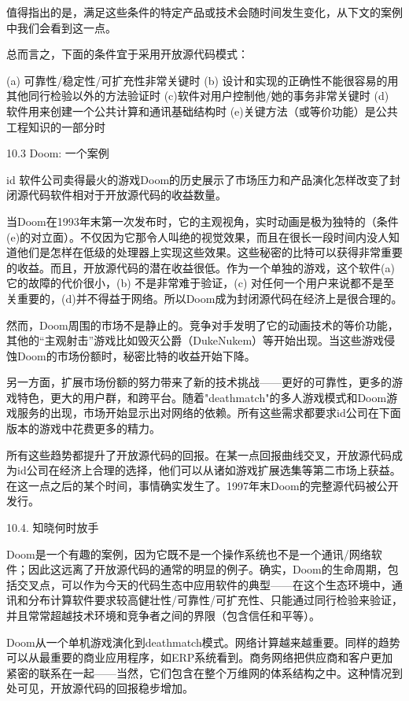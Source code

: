 \documentclass[a4paper,12pt,UTF8,twoside]{ctexbook}
\begin{document}
值得指出的是，满足这些条件的特定产品或技术会随时间发生变化，从下文的案例中我们会看到这一点。


总而言之，下面的条件宜于采用开放源代码模式：

(a) 可靠性/稳定性/可扩充性非常关键时
(b) 设计和实现的正确性不能很容易的用其他同行检验以外的方法验证时
(c)软件对用户控制他/她的事务非常关键时
(d) 软件用来创建一个公共计算和通讯基础结构时
(e)关键方法（或等价功能）是公共工程知识的一部分时


10.3 Doom: 一个案例


id 软件公司卖得最火的游戏Doom的历史展示了市场压力和产品演化怎样改变了封闭源代码软件相对于开放源代码的收益数量。


当Doom在1993年末第一次发布时，它的主观视角，实时动画是极为独特的（条件(e)的对立面）。不仅因为它那令人叫绝的视觉效果，而且在很长一段时间内没人知道他们是怎样在低级的处理器上实现这些效果。这些秘密的比特可以获得非常重要的收益。而且，开放源代码的潜在收益很低。作为一个单独的游戏，这个软件(a)它的故障的代价很小，(b) 不是非常难于验证，(c) 对任何一个用户来说都不是至关重要的，(d)并不得益于网络。所以Doom成为封闭源代码在经济上是很合理的。


然而，Doom周围的市场不是静止的。竞争对手发明了它的动画技术的等价功能，其他的“主观射击”游戏比如毁灭公爵（DukeNukem）等开始出现。当这些游戏侵蚀Doom的市场份额时，秘密比特的收益开始下降。


另一方面，扩展市场份额的努力带来了新的技术挑战——更好的可靠性，更多的游戏特色，更大的用户群，和跨平台。随着"deathmatch"的多人游戏模式和Doom游戏服务的出现，市场开始显示出对网络的依赖。所有这些需求都要求id公司在下面版本的游戏中花费更多的精力。


所有这些趋势都提升了开放源代码的回报。在某一点回报曲线交叉，开放源代码成为id公司在经济上合理的选择，他们可以从诸如游戏扩展选集等第二市场上获益。在这一点之后的某个时间，事情确实发生了。1997年末Doom的完整源代码被公开发行。


10.4. 知晓何时放手


Doom是一个有趣的案例，因为它既不是一个操作系统也不是一个通讯/网络软件；因此这远离了开放源代码的通常的明显的例子。确实，Doom的生命周期，包括交叉点，可以作为今天的代码生态中应用软件的典型——在这个生态环境中，通讯和分布计算软件要求较高健壮性/可靠性/可扩充性、只能通过同行检验来验证，并且常常超越技术环境和竞争者之间的界限（包含信任和平等）。


Doom从一个单机游戏演化到deathmatch模式。网络计算越来越重要。同样的趋势可以从最重要的商业应用程序，如ERP系统看到。商务网络把供应商和客户更加紧密的联系在一起——当然，它们包含在整个万维网的体系结构之中。这种情况到处可见，开放源代码的回报稳步增加。
\end{document}
